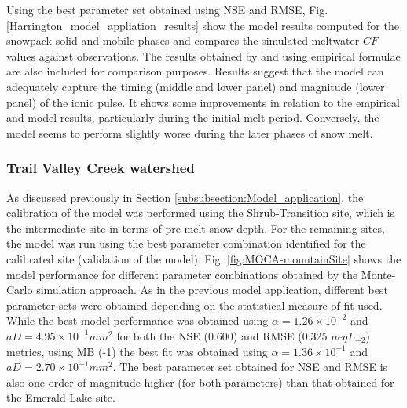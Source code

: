 \documentclass[authoryear,preprint,review,12pt]{elsarticle}
\begin{document}
Using the best parameter set obtained using NSE and RMSE, Fig. \ref{Harrington_model_appliation_results} show the model results computed for the snowpack solid and mobile phases and compares the simulated meltwater $CF$ values against observations. The results obtained by \citet{Harrington1998} and using empirical formulae are also included for comparison purposes. Results suggest that the model can adequately capture the timing (middle and lower panel) and magnitude (lower panel) of the ionic pulse. It shows some improvements in relation to the empirical and \citet{Harrington1998} model results, particularly during the initial melt period. Conversely, the model seems to perform slightly worse during the later phases of snow melt. \par




\subsubsection{Trail Valley Creek watershed}

As discussed previously in Section \ref{subsubsection:Model_application}, the calibration of the model was performed using the Shrub-Transition site, which is the intermediate site in terms of pre-melt snow depth. For the remaining sites, the model was run using the best parameter combination identified for the calibrated site (validation of the model). Fig. \ref{fig:MOCA-mountainSite} shows the model performance for different parameter combinations obtained by the Monte-Carlo simulation approach. As in the previous model application, different best parameter sets were obtained depending on the statistical measure of fit used. While the best model performance was obtained using $\alpha = 1.26 \times 10^{-2}$ and $aD = 4.95 \times 10^{-1} mm^2$ for both the NSE (0.600) and RMSE (0.325 $\mu eq L_{-2}$) metrics, using MB (-1) the best fit was obtained using $\alpha = 1.36 \times 10^{-1}$ and $aD = 2.70 \times 10^{-1} mm^2$. The best parameter set obtained for NSE and RMSE is also one order of magnitude higher (for both parameters) than that obtained for the Emerald Lake site.
\end{document}
